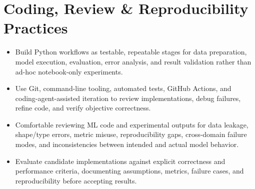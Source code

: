 \documentclass[10pt,letterpaper]{extarticle}
\begin{document}
\section{Coding, Review \& Reproducibility Practices}
\begin{itemize}
\item Build Python workflows as testable, repeatable stages for data preparation, model execution, evaluation, error analysis, and result validation rather than ad-hoc notebook-only experiments.
\item Use Git, command-line tooling, automated tests, GitHub Actions, and coding-agent-assisted iteration to review implementations, debug failures, refine code, and verify objective correctness.
\item Comfortable reviewing ML code and experimental outputs for data leakage, shape/type errors, metric misuse, reproducibility gaps, cross-domain failure modes, and inconsistencies between intended and actual model behavior.
\item Evaluate candidate implementations against explicit correctness and performance criteria, documenting assumptions, metrics, failure cases, and reproducibility before accepting results.
\end{itemize}
\end{document}
